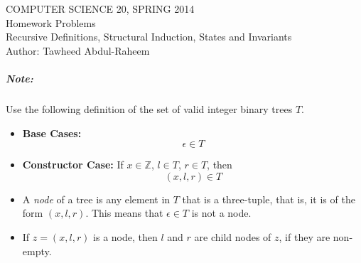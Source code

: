 \documentclass[12pt]{article}
\begin{document}
\begin{center}
COMPUTER SCIENCE 20, SPRING 2014 \\
Homework Problems\\
Recursive Definitions, Structural Induction, States and Invariants\\
Author: Tawheed Abdul-Raheem
\end{center}

\smallskip

\subparagraph*{Note:}
Use the following definition of the set of valid integer binary trees $T$.
\begin{itemize}
\item \textbf{Base Cases:} $$\epsilon \in T$$
\item \textbf{Constructor Case:} If $x \in \mathbb{Z}$, $l \in T$, $r \in T$, then
$$(x,l,r) \in T$$
\item A \textit{node} of a tree is any element in $T$ that is a three-tuple, that is, it is of the form $(x,l,r)$. This means that $\epsilon \in T$ is not a node.
\item If $z = (x,l,r)$ is a node, then $l$ and $r$ are child nodes of $z$, if they are non-empty.
\end{itemize}
\end{document}
